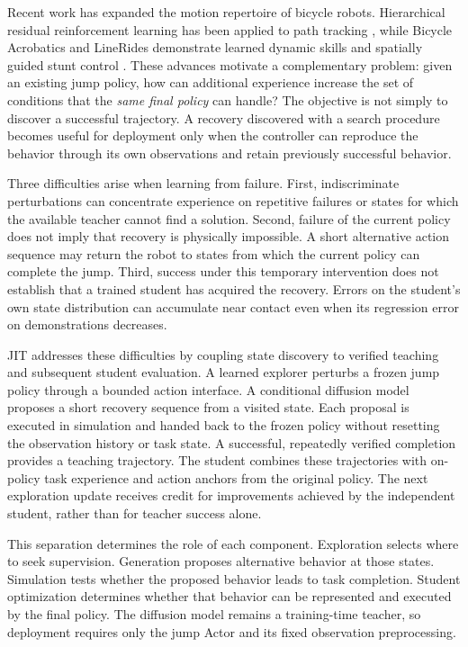 \documentclass[
  american,
  11pt,
  a4paper,
]{article}
\begin{document}
Recent work has expanded the motion repertoire of bicycle robots.
Hierarchical residual reinforcement learning has been applied to path
tracking \cite{huo2025hrrl}, while Bicycle Acrobatics and LineRides demonstrate
learned dynamic skills and spatially guided stunt control \cite{fahmi2026bicycle,rho2026linerides}.
These advances motivate a complementary problem: given an existing jump
policy, how can additional experience increase the set of conditions
that the \emph{same final policy} can handle? The objective is not
simply to discover a successful trajectory. A recovery discovered with a
search procedure becomes useful for deployment only when the controller
can reproduce the behavior through its own observations and retain
previously successful behavior.

Three difficulties arise when learning from failure. First,
indiscriminate perturbations can concentrate experience on repetitive
failures or states for which the available teacher cannot find a
solution. Second, failure of the current policy does not imply that
recovery is physically impossible. A short alternative action sequence
may return the robot to states from which the current policy can
complete the jump. Third, success under this temporary intervention does
not establish that a trained student has acquired the recovery. Errors
on the student's own state distribution can accumulate near contact even
when its regression error on demonstrations decreases.

JIT addresses these difficulties by coupling state discovery to verified
teaching and subsequent student evaluation. A learned explorer perturbs
a frozen jump policy through a bounded action interface. A conditional
diffusion model proposes a short recovery sequence from a visited state.
Each proposal is executed in simulation and handed back to the frozen
policy without resetting the observation history or task state. A
successful, repeatedly verified completion provides a teaching
trajectory. The student combines these trajectories with on-policy task
experience and action anchors from the original policy. The next
exploration update receives credit for improvements achieved by the
independent student, rather than for teacher success alone.

This separation determines the role of each component. Exploration
selects where to seek supervision. Generation proposes alternative
behavior at those states. Simulation tests whether the proposed behavior
leads to task completion. Student optimization determines whether that
behavior can be represented and executed by the final policy. The
diffusion model remains a training-time teacher, so deployment requires
only the jump Actor and its fixed observation preprocessing.
\end{document}
